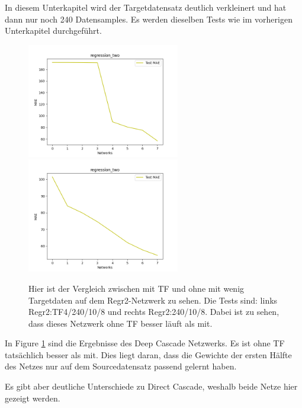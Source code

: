In diesem Unterkapitel wird der Targetdatensatz deutlich verkleinert und hat dann nur noch 240 Datensamples. Es werden dieselben Tests wie 
im vorherigen Unterkapitel durchgeführt. 


\begin{figure}[htpb]
    \includegraphics[height=5cm]{../../Plots/ba_plots/regression_small/regr2_ts.png}
    \includegraphics[height=5cm]{../../Plots/ba_plots/regression_small/woregr2_ts.png}
    \caption{\label{fig:smallregr} 
    \small{Hier ist der Vergleich zwischen mit TF und ohne mit wenig Targetdaten auf dem Regr2-Netzwerk zu sehen. 
    Die Tests sind: links Regr2:TF4/240/10/8 und rechts Regr2:240/10/8. Dabei ist zu sehen, dass dieses Netzwerk ohne TF besser läuft als mit.}}
\end{figure}

In Figure \ref{fig:smallregr} sind die Ergebnisse des Deep Cascade Netzwerks. Es ist ohne TF tatsächlich besser als mit. Dies liegt daran, dass die Gewichte der 
ersten Hälfte des Netzes nur auf dem Sourcedatensatz passend gelernt haben. 

Es gibt aber deutliche Unterschiede zu Direct Cascade, weshalb beide Netze hier gezeigt werden. 

